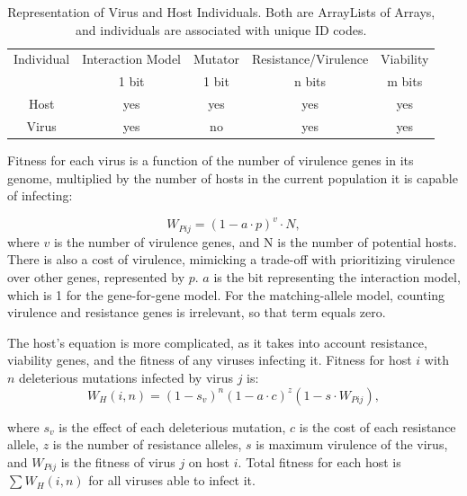 \documentclass[11pt, oneside]{article}
\begin{document}
\begin{table}[H]
	\begin{center}
	 \begin{tabular}{||c c c c c||} 
	 \hline
	Individual & Interaction Model & Mutator & Resistance/Virulence & Viability\\ 
	& 1 bit & 1 bit & n bits & m bits\\
	 \hline\hline
 	Host & yes & yes & yes & yes\\
	 \hline
 	Virus & yes & no & yes & yes\\
	 \hline
	\end{tabular}
	\caption{Representation of Virus and Host Individuals. Both are ArrayLists of Arrays, and individuals are associated with unique ID codes.}
	\label{table:1}
	\end{center}
\end{table}

Fitness for each virus is a function of the number of virulence genes in its genome, multiplied by the number of hosts in the current population it is capable of infecting:

\begin{equation}
W_{Pij} = (1-a\cdot p)^v\cdot N,
\end{equation}
where $v$ is the number of virulence genes, and N is the number of potential hosts. There is also a cost of virulence, mimicking a trade-off with prioritizing virulence over other genes, represented by $p$. $a$ is the bit representing the interaction model, which is 1 for the gene-for-gene model. For the matching-allele model, counting virulence and resistance genes is irrelevant, so that term equals zero.

The host's equation is more complicated, as it takes into account resistance, viability genes, and the fitness of any viruses infecting it. Fitness for host $i$ with $n$ deleterious mutations infected by virus $j$ is:
\begin{equation}
W_{H}(i,n) = (1-s_{v})^n(1-a\cdot c)^z(1-s\cdot W_{Pij}),
\end{equation}

where $s_{v}$ is the effect of each deleterious mutation, $c$ is the cost of each resistance allele, $z$ is the number of resistance alleles, $s$ is maximum virulence of the virus, and $W_{Pij}$ is the fitness of virus $j$ on host $i$. Total fitness for each host is $\sum W_{H}(i,n)$ for all viruses able to infect it. 
\end{document}

